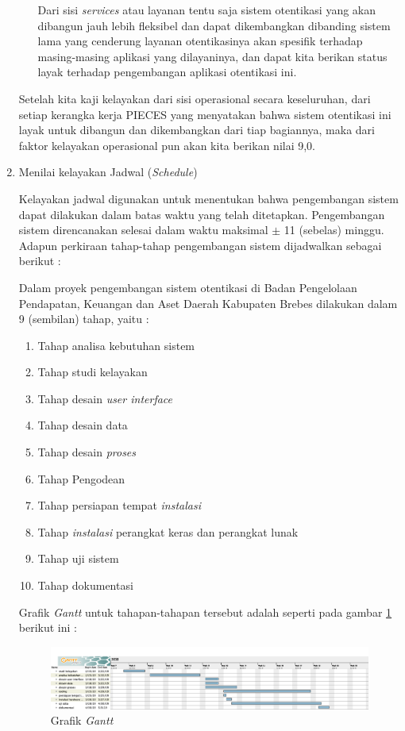 \documentclass[pdftex,12pt, oneside]{article}
\begin{document}
\begin{enumerate}
\begin{itemize}
Dari sisi \textit{services} atau layanan tentu saja sistem otentikasi yang akan dibangun jauh lebih fleksibel dan dapat dikembangkan dibanding sistem lama yang cenderung layanan otentikasinya akan spesifik terhadap masing-masing aplikasi yang dilayaninya, dan dapat kita berikan status layak terhadap pengembangan aplikasi otentikasi ini.

\end{itemize}

Setelah kita kaji kelayakan dari sisi operasional secara keseluruhan, dari setiap kerangka kerja PIECES yang menyatakan bahwa sistem otentikasi ini layak untuk dibangun dan dikembangkan dari tiap bagiannya, maka dari faktor kelayakan operasional pun akan kita berikan nilai 9,0.

	\item Menilai kelayakan Jadwal (\textit{Schedule})
	
Kelayakan jadwal digunakan untuk menentukan bahwa pengembangan sistem dapat dilakukan dalam batas waktu yang telah ditetapkan. Pengembangan sistem direncanakan selesai dalam waktu maksimal $\pm$ 11 (sebelas) minggu. Adapun perkiraan tahap-tahap pengembangan sistem dijadwalkan sebagai berikut :

Dalam proyek pengembangan sistem otentikasi di Badan Pengelolaan Pendapatan, Keuangan dan Aset Daerah Kabupaten Brebes dilakukan dalam 9 (sembilan) tahap, yaitu :

\begin{enumerate}
	\item Tahap analisa kebutuhan sistem 
	\item Tahap studi kelayakan
	\item Tahap desain \textit{user interface}
	\item Tahap desain data
	\item Tahap desain \textit{proses}
	\item Tahap Pengodean
	\item Tahap persiapan tempat \textit{instalasi}
	\item Tahap \textit{instalasi} perangkat keras dan perangkat lunak
	\item Tahap uji sistem
	\item Tahap dokumentasi
\end{enumerate}

Grafik \textit{Gantt} untuk tahapan-tahapan tersebut adalah seperti pada gambar \ref{fig:002-gantt-chart} berikut ini :

\begin{figure}[H]
	\centering
	\includegraphics[width=1\textwidth]{./resources/gantt-chart}
	\caption{Grafik \textit{Gantt}}
	\label{fig:002-gantt-chart}
\end{figure}


\end{enumerate}
\end{document}
